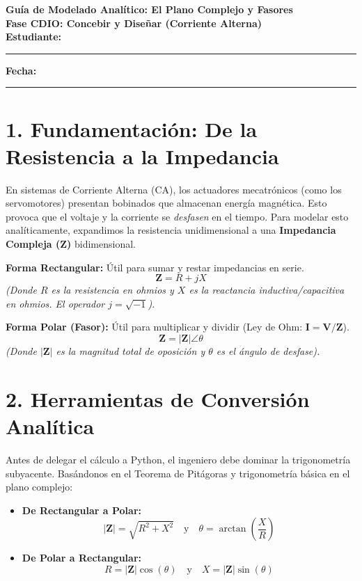 \documentclass[11pt,a4paper]{article}
\begin{document}
\begin{center}
    {\Large \textbf{\textcolor{UCBblue}{Guía de Modelado Analítico: El Plano Complejo y Fasores}}}\\
    \vspace{0.3cm}
    {\large \textbf{Fase CDIO: Concebir y Diseñar (Corriente Alterna)}}\\
    \vspace{0.5cm}
    \textbf{Estudiante:} \rule{8cm}{0.4pt} \quad \textbf{Fecha:} \rule{3cm}{0.4pt}
\end{center}

\vspace{0.5cm}

\section*{1. Fundamentación: De la Resistencia a la Impedancia}
En sistemas de Corriente Alterna (CA), los actuadores mecatrónicos (como los servomotores) presentan bobinados que almacenan energía magnética. Esto provoca que el voltaje y la corriente se \textit{desfasen} en el tiempo. Para modelar esto analíticamente, expandimos la resistencia unidimensional a una \textbf{Impedancia Compleja ($\mathbf{Z}$)} bidimensional.

\begin{tcolorbox}[colback=blue!5!white,colframe=UCBblue,title=\textbf{Forma Rectangular vs. Forma Polar}]
\textbf{Forma Rectangular:} Útil para sumar y restar impedancias en serie.
$$ \mathbf{Z} = R + jX $$
\textit{(Donde $R$ es la resistencia en ohmios y $X$ es la reactancia inductiva/capacitiva en ohmios. El operador $j = \sqrt{-1}$).}

\vspace{0.3cm}
\textbf{Forma Polar (Fasor):} Útil para multiplicar y dividir (Ley de Ohm: $\mathbf{I} = \mathbf{V}/\mathbf{Z}$).
$$ \mathbf{Z} = |\mathbf{Z}|\angle\theta $$
\textit{(Donde $|\mathbf{Z}|$ es la magnitud total de oposición y $\theta$ es el ángulo de desfase).}
\end{tcolorbox}

\section*{2. Herramientas de Conversión Analítica}
Antes de delegar el cálculo a Python, el ingeniero debe dominar la trigonometría subyacente. Basándonos en el Teorema de Pitágoras y trigonometría básica en el plano complejo:

\begin{itemize}
    \item \textbf{De Rectangular a Polar:}
    $$ |\mathbf{Z}| = \sqrt{R^2 + X^2} \quad \text{y} \quad \theta = \arctan\left(\frac{X}{R}\right) $$
    \item \textbf{De Polar a Rectangular:}
    $$ R = |\mathbf{Z}| \cos(\theta) \quad \text{y} \quad X = |\mathbf{Z}| \sin(\theta) $$
\end{itemize}
\end{document}

